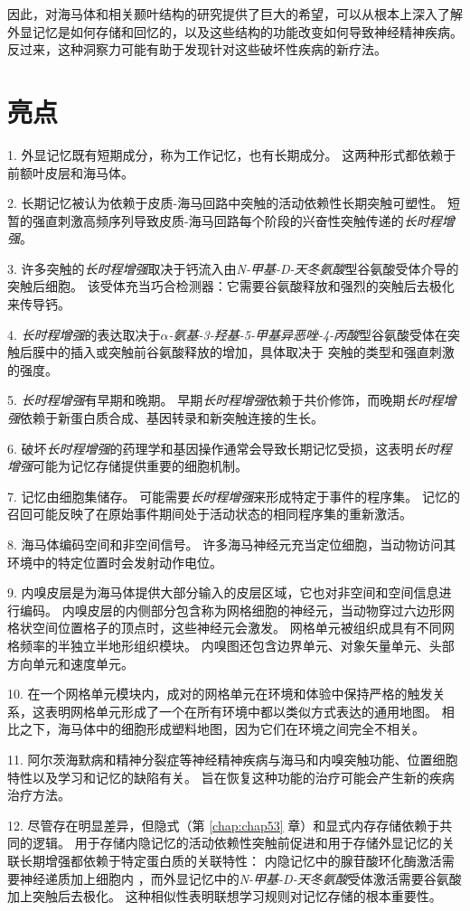 因此，对海马体和相关颞叶结构的研究提供了巨大的希望，可以从根本上深入了解外显记忆是如何存储和回忆的，以及这些结构的功能改变如何导致神经精神疾病。
反过来，这种洞察力可能有助于发现针对这些破坏性疾病的新疗法。



\section{亮点}

1. 外显记忆既有短期成分，称为工作记忆，也有长期成分。
这两种形式都依赖于前额叶皮层和海马体。 


2. 长期记忆被认为依赖于皮质-海马回路中突触的活动依赖性长期突触可塑性。
短暂的强直刺激高频序列导致皮质-海马回路每个阶段的兴奋性突触传递的\textit{长时程增强}。


3. 许多突触的\textit{长时程增强}取决于钙流入由\textit{N-甲基-D-天冬氨酸}型谷氨酸受体介导的突触后细胞。
该受体充当巧合检测器：它需要谷氨酸释放和强烈的突触后去极化来传导钙。 


4. \textit{长时程增强}的表达取决于\textit{$\alpha$-氨基-3-羟基-5-甲基异恶唑-4-丙酸}型谷氨酸受体在突触后膜中的插入或突触前谷氨酸释放的增加，具体取决于 突触的类型和强直刺激的强度。


5. \textit{长时程增强}有早期和晚期。
早期\textit{长时程增强}依赖于共价修饰，而晚期\textit{长时程增强}依赖于新蛋白质合成、基因转录和新突触连接的生长。


6. 破坏\textit{长时程增强}的药理学和基因操作通常会导致长期记忆受损，这表明\textit{长时程增强}可能为记忆存储提供重要的细胞机制。


7. 记忆由细胞集储存。
可能需要\textit{长时程增强}来形成特定于事件的程序集。
记忆的召回可能反映了在原始事件期间处于活动状态的相同程序集的重新激活。


8. 海马体编码空间和非空间信号。
许多海马神经元充当定位细胞，当动物访问其环境中的特定位置时会发射动作电位。


9. 内嗅皮层是为海马体提供大部分输入的皮层区域，它也对非空间和空间信息进行编码。
内嗅皮层的内侧部分包含称为网格细胞的神经元，当动物穿过六边形网格状空间位置格子的顶点时，这些神经元会激发。
网格单元被组织成具有不同网格频率的半独立半地形组织模块。
内嗅图还包含边界单元、对象矢量单元、头部方向单元和速度单元。


10. 在一个网格单元模块内，成对的网格单元在环境和体验中保持严格的触发关系，这表明网格单元形成了一个在所有环境中都以类似方式表达的通用地图。
相比之下，海马体中的细胞形成塑料地图，因为它们在环境之间完全不相关。


11. 阿尔茨海默病和精神分裂症等神经精神疾病与海马和内嗅突触功能、位置细胞特性以及学习和记忆的缺陷有关。
旨在恢复这种功能的治疗可能会产生新的疾病治疗方法。 


12. 尽管存在明显差异，但隐式（第 \ref{chap:chap53} 章）和显式内存存储依赖于共同的逻辑。
用于存储内隐记忆的活动依赖性突触前促进和用于存储外显记忆的关联长期增强都依赖于特定蛋白质的关联特性：
内隐记忆中的腺苷酸环化酶激活需要神经递质加上细胞内 ，而外显记忆中的\textit{N-甲基-D-天冬氨酸}受体激活需要谷氨酸 加上突触后去极化。
这种相似性表明联想学习规则对记忆存储的根本重要性。






